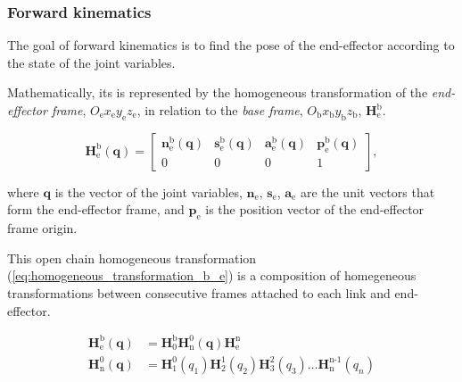 \subsubsection{Forward kinematics}
\label{subsubsec:forward_kinematics}

The goal of forward kinematics is to find the pose of the end-effector according to the state of the joint variables.

Mathematically, its is represented by the homogeneous transformation of the \emph{end-effector frame}, $O_{\text{e}}x_{\text{e}}y_{\text{e}}z_{\text{e}}$, in relation to the \emph{base frame}, $O_{\text{b}}x_{\text{b}}y_{\text{b}}z_{\text{b}}$, $\boldsymbol{H}^{\text{b}}_{\text{e}}$. 

\begin{equation}
    \boldsymbol{H}^{\text{b}}_{\text{e}}(\boldsymbol{q}) =
    \begin{bmatrix}
    \boldsymbol{n}^{\text{b}}_{\text{e}}(\boldsymbol{q}) & \boldsymbol{s}^{\text{b}}_{\text{e}}(\boldsymbol{q}) & \boldsymbol{a}^{\text{b}}_{\text{e}}(\boldsymbol{q}) & \boldsymbol{p}^{\text{b}}_{\text{e}}(\boldsymbol{q})\\
    0 & 0 & 0 & 1
    \end{bmatrix},
\end{equation}

where $\boldsymbol{q}$ is the vector of the joint variables, $\boldsymbol{n}_{\text{e}}$, $\boldsymbol{s}_{\text{e}}$, $\boldsymbol{a}_{\text{e}}$ are the unit vectors that form the end-effector frame, and $\boldsymbol{p}_{\text{e}}$ is the position vector of the end-effector frame origin.

This open chain homogeneous transformation (\ref{eq:homogeneous_transformation_b_e}) is a composition of homegeneous transformations between consecutive frames attached to each link and end-effector.

\begin{align}
    \label{eq:homogeneous_transformation_b_e}
    \boldsymbol{H}^{\text{b}}_{\text{e}}(\boldsymbol{q}) &= \boldsymbol{H}^{\text{b}}_{\text{0}}\boldsymbol{H}^{\text{0}}_{\text{n}}(\boldsymbol{q})\boldsymbol{H}^{\text{n}}_{\text{e}} \\
    \boldsymbol{H}^{\text{0}}_{\text{n}}(\boldsymbol{q}) &= \boldsymbol{H}^{\text{0}}_{\text{1}}(q_1)\boldsymbol{H}^{\text{1}}_{\text{2}}(q_2)\boldsymbol{H}^{\text{2}}_{\text{3}}(q_3)\ldots\boldsymbol{H}^{\text{n-1}}_{\text{n}}(q_n)
\end{align}

